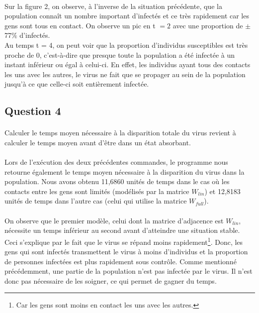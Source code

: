 \documentclass[a4paper, 12pt, oneside]{article}
\begin{document}
\paragraph{}Sur la figure 2, on observe, à l'inverse de la situation précédente, que la population connaît un nombre important d'infectés et ce très rapidement car les gens sont tous en contact. On observe un pic en t $= 2$ avec une proportion de $\pm$ 77$\%$ d'infectés.\\
Au temps t = 4, on peut voir que la proportion d'individus susceptibles est très proche de 0, c'est-à-dire que presque toute la population a été infectée à un instant inférieur ou égal à celui-ci. En effet, les individus ayant tous des contacts les uns avec les autres, le virus ne fait que se propager au sein de la population jusqu'à ce que celle-ci soit entièrement infectée.

\subsection{Question 4}

\paragraph{}Calculer le temps moyen nécessaire à la disparition totale du virus revient à calculer le temps moyen avant d'être dans un état absorbant.

\paragraph{}Lors de l'exécution des deux précédentes commandes, le programme nous retourne également le temps moyen nécessaire à la disparition du virus dans la population. Nous avons obtenu 11,6860 unités de temps dans le cas où les contacts entre les gens sont limités (modélisés par la matrice $W_{lin}$) et 12,8183 unités de temps dans l'autre cas (celui qui utilise la matrice $W_{full}$).

\paragraph{}On observe que le premier modèle, celui dont la matrice d'adjacence est $W_{lin}$, nécessite un temps inférieur au second avant d'atteindre une situation stable. Ceci s'explique par le fait que le virus se répand moins rapidement\footnote{Car les gens sont moins en contact les uns avec les autres.}. Donc, les gens qui sont infectés transmettent le virus à moins d'individus et la proportion de personnes infectées est plus rapidement sous contrôle. Comme mentionné précédemment, une partie de la population n'est pas infectée par le virus. Il n'est donc pas nécessaire de les soigner, ce qui permet de gagner du temps.
\end{document}
